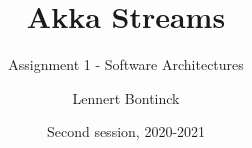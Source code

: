 \title{Akka Streams}
\subtitle{Assignment 1 - Software Architectures}
\author{Lennert Bontinck}
\date{Second session, 2020-2021}
